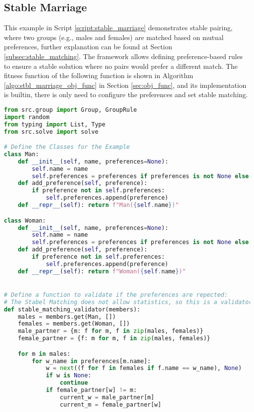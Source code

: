\subsection{Stable Marriage}
This example in Script \ref{script:stable_marriage} demonstrates stable pairing, where two groups (e.g., males and females) are matched based on mutual preferences, further explanation can be found at Section \ref{subsec:stable_matching}. The framework allows defining preference-based rules to ensure a stable solution where no pairs would prefer a different match.
The fitness function of the following function is shown in Algorithm \ref{algo:stbl_marriage_obj_func} in Section \ref{sec:obj_func}, and its implementation is builtin, there is only need to configure the preferences and set stable matching.

\begin{lstlisting}[language=Python, caption={Creating and solving the Stable Marriage Problem using this framework.}, label={script:stable_marriage}]
from src.group import Group, GroupRule
import random
from typing import List, Type
from src.solve import solve

# Define the Classes for the Example
class Man:
    def __init__(self, name, preferences=None):
        self.name = name
        self.preferences = preferences if preferences is not None else []
    def add_preference(self, preference):
        if preference not in self.preferences:
            self.preferences.append(preference)
    def __repr__(self): return f"Man({self.name})"

class Woman:
    def __init__(self, name, preferences=None):
        self.name = name
        self.preferences = preferences if preferences is not None else []
    def add_preference(self, preference):
        if preference not in self.preferences:
            self.preferences.append(preference)
    def __repr__(self): return f"Woman({self.name})"


# Define a function to validate if the preferences are repected:
# The Stabel Matching does not allow statistics, so this is a validator function.
def stable_matching_validator(members):
    males = members.get(Man, [])
    females = members.get(Woman, [])
    male_partner = {m: f for m, f in zip(males, females)}
    female_partner = {f: m for m, f in zip(males, females)}

    for m in males:
        for w_name in preferences[m.name]:
            w = next((f for f in females if f.name == w_name), None)
            if w is None:
                continue
            if female_partner[w] != m:
                current_w = male_partner[m]
                current_m = female_partner[w]


\end{lstlisting}
